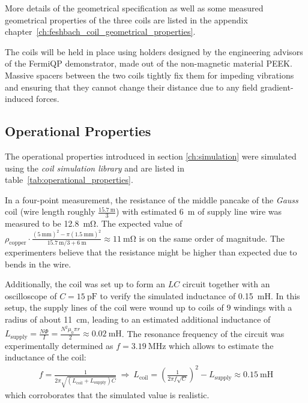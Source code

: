 More details of the geometrical specification as well as some measured geometrical properties of the three coils are listed in the appendix chapter~\ref{ch:feshbach_coil_geometrical_properties}.

The coils will be held in place using holders designed by the engineering advisors of the FermiQP demonstrator, made out of the non-magnetic material PEEK. Massive spacers between the two coils tightly fix them for impeding vibrations and ensuring that they cannot change their distance due to any field gradient-induced forces.

\subsection*{Operational Properties}
The operational properties introduced in section \ref{ch:simulation} were simulated using the \textit{coil simulation library} and are listed in table~\ref{tab:operational_properties}.

In a four-point measurement, the resistance of the middle pancake of the \textit{Gauss} coil (wire length roughly $\frac{\SI{15.7}{\meter}}{3}$) with estimated \SI{6}{\meter} of supply line wire was measured to be \SI{12.8}{\milli\ohm}. The expected value of $\rho_\text{copper} \cdot \frac{(\SI{5}{\milli\meter})^2 - \pi(\SI{1.5}{\milli\meter})^2}{\SI{15.7}{\meter}/3 + \SI{6}{\meter}} \approx \SI{11}{\milli\ohm}$ is on the same order of magnitude. The experimenters believe that the resistance might be higher than expected due to bends in the wire.

Additionally, the coil was set up to form an $LC$ circuit together with an oscilloscope of $C = \SI{15}{\pico\farad}$ to verify the simulated inductance of \SI{0.15}{\milli\henry}. In this setup, the supply lines of the coil were wound up to coils of $9$ windings with a radius of about \SI{11}{\centi\meter}, leading to an estimated additional inductance of $L_\text{supply} = \frac{N\Phi}{I} = \frac{N^2\mu_0\pi r}{2} \approx \SI{0.02}{\milli\henry}$. The resonance frequency of the circuit was experimentally determined as $f = \SI{3.19}{\mega\hertz}$ which allows to estimate the inductance of the coil:
\begin{align}
    f = \frac{1}{2\pi \sqrt{(L_\text{coil} + L_\text{supply})C}} ~\Rightarrow~ L_\text{coil} = \left(\frac{1}{2\pi f \sqrt{C}}\right)^2 - L_\text{supply} \approx \SI{0.15}{\milli\henry}
\end{align}
which corroborates that the simulated value is realistic.

